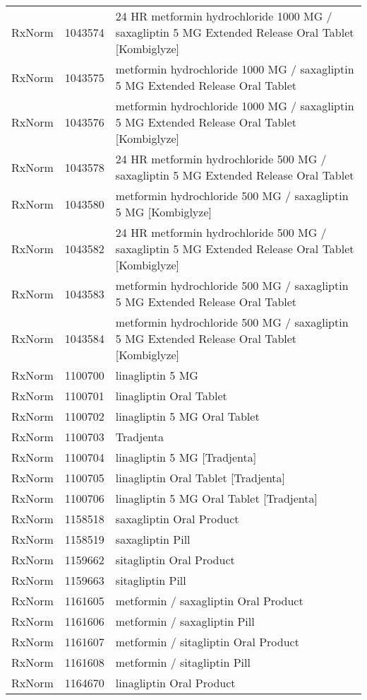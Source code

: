 \begin{longtable}{p{}p{}p{}}
  RxNorm & 1043574 & 24 HR metformin hydrochloride 1000 MG / saxagliptin 5 MG Extended Release Oral Tablet [Kombiglyze] \\ 
  RxNorm & 1043575 & metformin hydrochloride 1000 MG / saxagliptin 5 MG Extended Release Oral Tablet \\ 
  RxNorm & 1043576 & metformin hydrochloride 1000 MG / saxagliptin 5 MG Extended Release Oral Tablet [Kombiglyze] \\ 
  RxNorm & 1043578 & 24 HR metformin hydrochloride 500 MG / saxagliptin 5 MG Extended Release Oral Tablet \\ 
  RxNorm & 1043580 & metformin hydrochloride 500 MG / saxagliptin 5 MG [Kombiglyze] \\ 
  RxNorm & 1043582 & 24 HR metformin hydrochloride 500 MG / saxagliptin 5 MG Extended Release Oral Tablet [Kombiglyze] \\ 
  RxNorm & 1043583 & metformin hydrochloride 500 MG / saxagliptin 5 MG Extended Release Oral Tablet \\ 
  RxNorm & 1043584 & metformin hydrochloride 500 MG / saxagliptin 5 MG Extended Release Oral Tablet [Kombiglyze] \\ 
  RxNorm & 1100700 & linagliptin 5 MG \\ 
  RxNorm & 1100701 & linagliptin Oral Tablet \\ 
  RxNorm & 1100702 & linagliptin 5 MG Oral Tablet \\ 
  RxNorm & 1100703 & Tradjenta \\ 
  RxNorm & 1100704 & linagliptin 5 MG [Tradjenta] \\ 
  RxNorm & 1100705 & linagliptin Oral Tablet [Tradjenta] \\ 
  RxNorm & 1100706 & linagliptin 5 MG Oral Tablet [Tradjenta] \\ 
  RxNorm & 1158518 & saxagliptin Oral Product \\ 
  RxNorm & 1158519 & saxagliptin Pill \\ 
  RxNorm & 1159662 & sitagliptin Oral Product \\ 
  RxNorm & 1159663 & sitagliptin Pill \\ 
  RxNorm & 1161605 & metformin / saxagliptin Oral Product \\ 
  RxNorm & 1161606 & metformin / saxagliptin Pill \\ 
  RxNorm & 1161607 & metformin / sitagliptin Oral Product \\ 
  RxNorm & 1161608 & metformin / sitagliptin Pill \\ 
  RxNorm & 1164670 & linagliptin Oral Product \\ 

\end{longtable}

